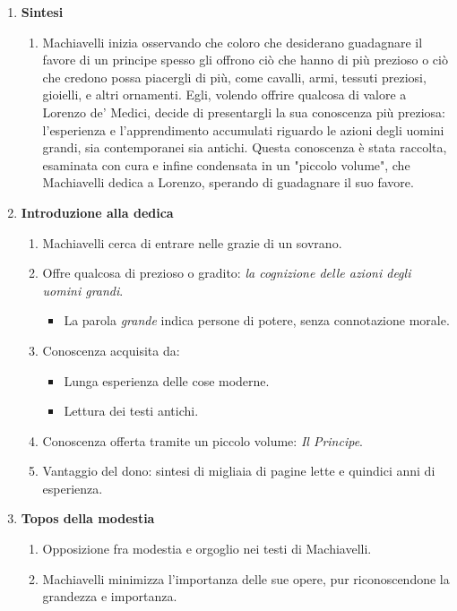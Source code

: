 \documentclass{article}
\begin{document}
\begin{enumerate}
    \item \textbf{Sintesi}
    \begin{enumerate}[label*=\arabic*.]
        \item Machiavelli inizia osservando che coloro che desiderano guadagnare il favore di un principe 
        spesso gli offrono ciò che hanno di più prezioso o ciò che credono possa piacergli di più, come 
        cavalli, armi, tessuti preziosi, gioielli, e altri ornamenti. Egli, volendo offrire qualcosa di valore a 
        Lorenzo de' Medici, decide di presentargli la sua conoscenza più preziosa: l'esperienza e 
        l'apprendimento accumulati riguardo le azioni degli uomini grandi, sia contemporanei sia antichi. 
        Questa conoscenza è stata raccolta, esaminata con cura e infine condensata in un "piccolo 
        volume", che Machiavelli dedica a Lorenzo, sperando di guadagnare il suo favore.
    \end{enumerate}
    \item \textbf{Introduzione alla dedica}
    \begin{enumerate}[label*=\arabic*.]
        \item Machiavelli cerca di entrare nelle grazie di un sovrano.
        \item Offre qualcosa di prezioso o gradito: \textit{la cognizione delle azioni degli uomini grandi}.
        \begin{itemize}
            \item La parola \textit{grande} indica persone di potere, senza connotazione morale.
        \end{itemize}
        \item Conoscenza acquisita da:
        \begin{itemize}
            \item Lunga esperienza delle cose moderne.
            \item Lettura dei testi antichi.
        \end{itemize}
        \item Conoscenza offerta tramite un piccolo volume: \textit{Il Principe}.
        \item Vantaggio del dono: sintesi di migliaia di pagine lette e quindici anni di esperienza.
    \end{enumerate}

    \item \textbf{Topos della modestia}
    \begin{enumerate}[label*=\arabic*.]
        \item Opposizione fra modestia e orgoglio nei testi di Machiavelli.
        \item Machiavelli minimizza l'importanza delle sue opere, pur riconoscendone la grandezza e importanza.
    \end{enumerate}


\end{enumerate}
\end{document}
